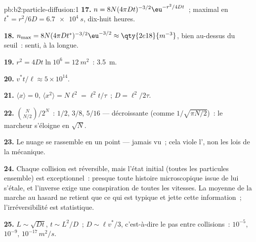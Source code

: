 \begin{solution}{pb:b2:particle-diffusion:1}
\textbf{17.} $n = 8N(4\pi Dt)^{-3/2}\eu^{-r^2/4Dt}$~; maximal en $t^* = r^2/6D =
\qty{6.7e4}{s}$, dix-huit heures.

\textbf{18.} $n_{\max} = 8N(4\pi Dt^*)^{-3/2}\eu^{-3/2} \approx \qty{2e18}{m^{-3}}$,
bien au-dessus du seuil~: senti, à la longue.

\textbf{19.} $r^2 = 4Dt\ln 10^6 = \qty{12}{m^2}$~: \qty{3.5}{m}.

\textbf{20.} $v^*t/\ell \approx 5 \times 10^{14}$.

\textbf{21.} $\langle x\rangle = 0$, $\langle x^2\rangle = N\ell^2 = \ell^2 t/\tau$~;
$D = \ell^2/2\tau$.

\textbf{22.} $\binom{N}{N/2}/2^N$~: $1/2$, $3/8$, $5/16$ --- décroissante
(comme $1/\sqrt{\pi N/2}$)~: le marcheur s'éloigne en $\sqrt N$.

\textbf{23.} Le nuage se rassemble en un point --- jamais vu~; cela
viole l', non les lois de la mécanique.

\textbf{24.} Chaque collision est réversible, mais l'état initial (toutes les
particules ensemble) est exceptionnel~: presque toute histoire microscopique
issue de lui s'étale, et l'inverse exige une conspiration de toutes les
vitesses. La moyenne de la marche au hasard ne retient que ce qui est typique et
jette cette information~; l'irréversibilité est statistique.

\textbf{25.} $L \sim \sqrt{Dt}$, $t \sim L^2/D$~; $D \sim \ell v^*/3$, c'est-à-dire
le pas entre collisions~: $10^{-5}$, $10^{-9}$, $10^{-17}\,\unit{m^2/s}$.
\end{solution}
